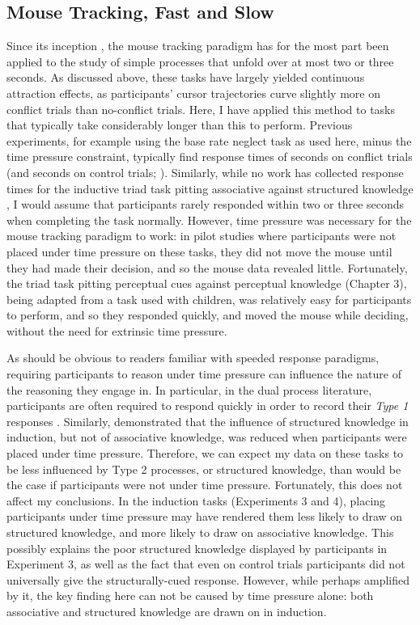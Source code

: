 \subsection{Mouse Tracking, Fast and Slow}

Since its inception \citep{Spivey2005},
the mouse tracking paradigm has for the most part
been applied to the study of simple processes
that unfold over at most two or three seconds.
As discussed above, these tasks have largely
yielded continuous attraction effects,
as participants' cursor trajectories
curve slightly more on conflict trials than no-conflict trials.
Here, I have applied this method to tasks that
typically take considerably longer than this to perform.
Previous experiments, for example using
the base rate neglect task as used here,
minus the time pressure constraint,
typically find response times of  seconds on conflict trials
(and  seconds on control trials;
\citealp{DeNeys2008,DeNeys2009a,Franssens2009}).
Similarly, while no work has collected response times
for the inductive triad task pitting associative against structured knowledge \citep{Bright},
I would assume that participants rarely responded
within two or three seconds when completing the task normally.
However, time pressure was necessary
for the mouse tracking paradigm to work:
in pilot studies where
participants were not placed under time pressure on these tasks,
they did not move the mouse until they had made their decision,
and so the mouse data revealed little.
Fortunately, the triad task pitting
perceptual cues against perceptual knowledge (Chapter 3),
being adapted from a task used with children,
was relatively easy for participants to perform,
and so they responded quickly, and moved the mouse while deciding,
without the need for extrinsic time pressure.

As should be obvious to readers familiar with speeded response paradigms,
requiring participants to reason under time pressure
can influence the nature of the reasoning they engage in.
In particular, in the dual process literature,
participants are often required to respond quickly
in order to record their \emph{Type 1} responses
\citep[e.g.][]{Villejoubert2009,Markovits2004,DeNeys2006a,Thompson2011}.
Similarly, \citet[Experiment 1]{Bright2014a} demonstrated that
the influence of structured knowledge in induction,
but not of associative knowledge,
was reduced when participants were placed under time pressure.
Therefore, we can expect my data on these tasks
to be less influenced by Type 2 processes,
or structured knowledge,
than would be the case if participants were not under time pressure.
Fortunately, this does not affect my conclusions.
In the induction tasks (Experiments 3 and 4),
placing participants under time pressure
may have rendered them less likely to draw on structured knowledge,
and more likely to draw on associative knowledge.
This possibly explains the poor structured knowledge
displayed by participants in Experiment 3,
as well as the fact that even on control trials
participants did not universally give the structurally-cued response.
However, while perhaps amplified by it,
the key finding here can not be
caused by time pressure alone:
both associative and structured knowledge
are drawn on in induction.


